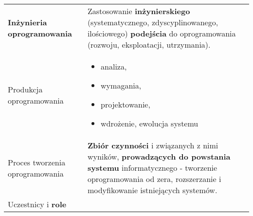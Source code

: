 \documentclass[../main.tex]{subfiles}
\begin{document}
    \begin{table}[H]
        \begin{center}
            \begin{tabular}{  p{8cm} p{8cm}  }
                \textbf{Inżynieria oprogramowania}
                &
                Zastosowanie \textbf{inżynierskiego} (systematycznego, zdyscyplinowanego, ilościowego) \textbf{podejścia}
                do oprogramowania (rozwoju, eksploatacji, utrzymania).
                \\
                \cmidrule(r){1-1}\cmidrule(l){2-2}
                Produkcja oprogramowania
                &
                \begin{itemize}
                    \item analiza,
                    \item wymagania,
                    \item projektowanie,
                    \item wdrożenie, ewolucja systemu
                \end{itemize}
                \\
                \cmidrule(r){1-1}\cmidrule(l){2-2}
                Proces tworzenia oprogramowania
                &
                \textbf{Zbiór czynności} i związanych z nimi wyników, \textbf{prowadzących do powstania
                systemu} informatycznego - tworzenie oprogramowania od zera, rozszerzanie i modyfikowanie istniejących systemów.
                \\
                \cmidrule(r){1-1}\cmidrule(l){2-2}
                Uczestnicy i \textbf{role} & \\


\end{tabular}
\end{center}
\end{table}
\end{document}
